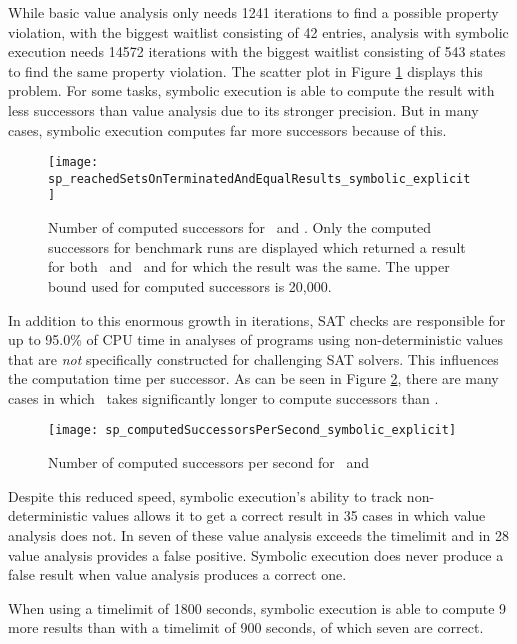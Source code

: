 While basic value analysis only needs 1241 iterations to find a possible property violation, with the biggest waitlist consisting of 42 entries,
analysis with symbolic execution needs 14572 iterations with the biggest waitlist consisting of 543 states to find the same property violation.
The scatter plot in Figure \ref{graph:computedSuccessors} displays this problem.
For some tasks, symbolic execution is able to compute the result with less successors than value analysis due to its stronger precision. But in many cases, symbolic execution computes far more successors because of this.
\begin{figure}[h]
\texttt{[image: sp\_reachedSetsOnTerminatedAndEqualResults\_symbolic\_explicit]}
\caption{Number of computed successors for \ and \symbolicExecutionCPA.
         Only the computed successors for benchmark runs are displayed which returned a result for both \symbolicExecutionCPA\ and \ and for which the result was the same. The upper bound used for computed successors is 20,000.}
\label{graph:computedSuccessors}
\end{figure}
In addition to this enormous growth in iterations, SAT checks are responsible for up to 95.0\% of CPU time in analyses of programs using non-deterministic values that are \emph{not} specifically constructed for challenging SAT solvers.
This influences the computation time per successor. As can be seen in Figure \ref{graph:computedSuccessorsPerS}, there are many cases in which \symbolicExecutionCPA\ takes significantly longer to compute successors than .
\begin{figure}[h]
\texttt{[image: sp\_computedSuccessorsPerSecond\_symbolic\_explicit]}
\caption{Number of computed successors per second for \ and \symbolicExecutionCPA}
\label{graph:computedSuccessorsPerS}
\end{figure}

Despite this reduced speed, symbolic execution's ability to track non-deterministic values allows it to get a correct result in 35 cases in which value analysis does not. In seven of these value analysis exceeds the timelimit and in 28 value analysis provides a false positive. Symbolic execution does never produce a false result when value analysis produces a correct one.

When using a timelimit of 1800 seconds, symbolic execution is able to compute 9 more results than with a timelimit of 900 seconds, of which seven are correct.

